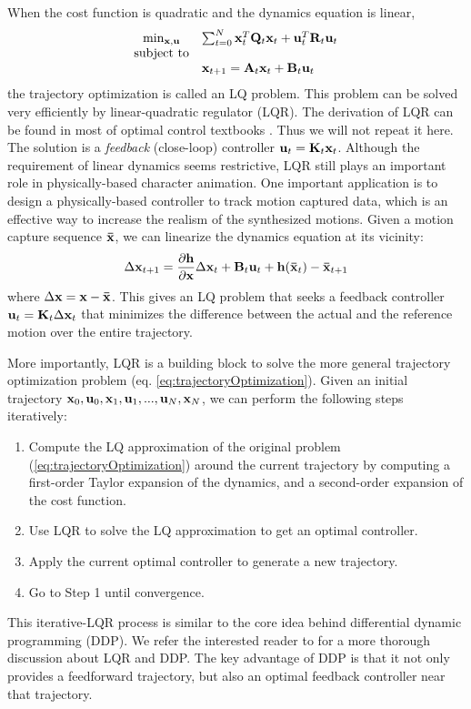 When the cost function is quadratic and the dynamics equation is linear,
\begin{equation}
  \begin{array}{cl}
    \min_{\vc{x},\vc{u}}&\sum_{t=0}^{N}\vc{x}_t^T\vc{Q}_t\vc{x}_t+\vc{u}_t^T\vc{R}_t\vc{u}_t\\
    \textrm{subject to}&\\
    &\vc{x}_{t+1}=\vc{A}_t\vc{x}_t+\vc{B}_t\vc{u}_t
  \end{array}
  \label{eq:LQR}
\end{equation}
the trajectory optimization is called an LQ problem. This problem can be solved very efficiently by linear-quadratic regulator (LQR). The derivation of LQR can be found in most of optimal control textbooks \cite{todorov2006optimal}. Thus we will not repeat it here. The solution is a \emph{feedback} (close-loop) controller $\mathbf{u}_t=\mathbf{K}_t\mathbf{x}_t$. Although the requirement of linear dynamics seems restrictive, LQR still plays an important role in physically-based character animation. One important application is to design a physically-based controller to track motion captured data, which is an effective way to increase the realism of the synthesized motions. Given a motion capture sequence $\mathbf{\bar{x}}$, we can linearize the dynamics equation at its vicinity:
\begin{displaymath}
  \Delta \mathbf{x}_{t+1}=\frac{\partial \mathbf{h}}{\partial \mathbf{x}}\Delta \mathbf{x}_{t}+\mathbf{B}_t\mathbf{u}_t+\mathbf{h}(\mathbf{\bar{x}}_t)-\mathbf{\bar{x}}_{t+1}
  \end{displaymath}
where $\Delta \mathbf{x}=\mathbf{x}-\mathbf{\bar{x}}$. This gives an LQ problem that seeks a feedback controller $\mathbf{u}_t=\mathbf{K}_t\Delta \mathbf{x}_t$ that minimizes the difference between the actual and the reference motion over the entire trajectory.

More importantly, LQR is a building block to solve the more general trajectory optimization problem (eq. \ref{eq:trajectoryOptimization}). Given an initial trajectory $\mathbf{x}_0, \mathbf{u}_0, \mathbf{x}_1, \mathbf{u}_1, ... , \mathbf{u}_N, \mathbf{x}_N$, we can perform the following steps iteratively:
\begin{enumerate}
\item{Compute the LQ approximation of the original problem (\ref{eq:trajectoryOptimization}) around the current trajectory by computing a first-order Taylor expansion of the dynamics, and a second-order expansion of the cost function.}
\item{Use LQR to solve the LQ approximation to get an optimal controller.}
\item{Apply the current optimal controller to generate a new trajectory.}
  \item{Go to Step 1 until convergence.}
\end{enumerate}
This iterative-LQR process is similar to the core idea behind differential dynamic programming (DDP). We refer the interested reader to \citet{todorov2006optimal} for a more thorough discussion about LQR and DDP. The key advantage of DDP is that it not only provides a feedforward trajectory, but also an optimal feedback controller near that trajectory.

